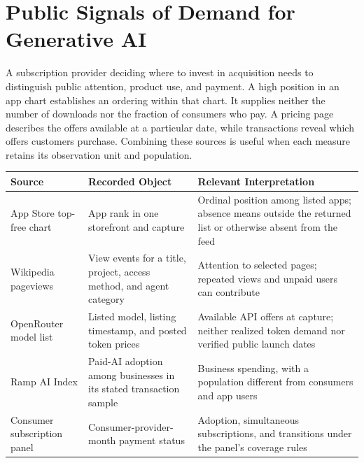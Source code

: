 \hypertarget{M02-public-signals-of-demand-for-generative-ai}{%
\section{Public Signals of Demand for Generative
AI}\label{M02-public-signals-of-demand-for-generative-ai}}

\noindent A subscription provider deciding where to invest in acquisition needs to
distinguish public attention, product use, and payment. A high position
in an app chart establishes an ordering within that chart. It supplies
neither the number of downloads nor the fraction of consumers who pay. A
pricing page describes the offers available at a particular date, while
transactions reveal which offers customers purchase. Combining these
sources is useful when each measure retains its observation unit and
population.

\begin{table}[H]
\centering\small
\begin{tabular}{@{}
  >{\raggedright\arraybackslash}p{}
  >{\raggedright\arraybackslash}p{}
  >{\raggedright\arraybackslash}p{}@{}}
\toprule
Source & Recorded Object & Relevant Interpretation \\
\midrule

App Store top-free chart & App rank in one storefront and capture &
Ordinal position among listed apps; absence means outside the returned
list or otherwise absent from the feed \\
Wikipedia pageviews & View events for a title, project, access method,
and agent category & Attention to selected pages; repeated views and
unpaid users can contribute \\
OpenRouter model list & Listed model, listing timestamp, and posted
token prices & Available API offers at capture; neither realized token
demand nor verified public launch dates \\
Ramp AI Index & Paid-AI adoption among businesses in its stated
transaction sample & Business spending, with a population different from
consumers and app users \\
Consumer subscription panel & Consumer-provider-month payment status &
Adoption, simultaneous subscriptions, and transitions under the panel's
coverage rules \\
\bottomrule
\end{tabular}
\end{table}


